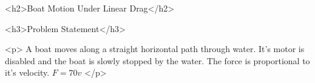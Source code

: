 
<h2>Boat Motion Under Linear Drag</h2>

<h3>Problem Statement</h3>

<p>
A boat moves along a straight horizontal path through water.
It's motor is disabled and the boat is slowly stopped by the water. 
The force is proportional to it's velocity.
$F = 70 v$
</p>